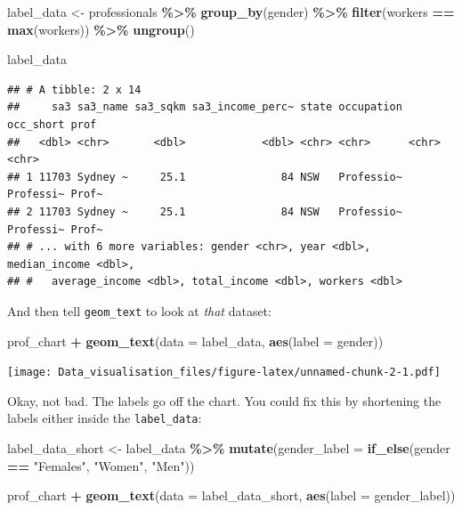 \documentclass[
]{book}
\newenvironment{Shaded}{\begin{snugshade}}{\end{snugshade}}
\newcommand{\DataTypeTok}[1]{\textcolor[rgb]{0.13,0.29,0.53}{#1}}
\newcommand{\KeywordTok}[1]{\textcolor[rgb]{0.13,0.29,0.53}{\textbf{#1}}}
\newcommand{\NormalTok}[1]{#1}
\newcommand{\OperatorTok}[1]{\textcolor[rgb]{0.81,0.36,0.00}{\textbf{#1}}}
\newcommand{\StringTok}[1]{\textcolor[rgb]{0.31,0.60,0.02}{#1}}
\begin{document}
\begin{Shaded}
\begin{Highlighting}[]
\NormalTok{label\_data \textless{}{-}}\StringTok{ }\NormalTok{professionals }\OperatorTok{\%\textgreater{}\%}\StringTok{ }
\StringTok{  }\KeywordTok{group\_by}\NormalTok{(gender) }\OperatorTok{\%\textgreater{}\%}\StringTok{ }
\StringTok{  }\KeywordTok{filter}\NormalTok{(workers }\OperatorTok{==}\StringTok{ }\KeywordTok{max}\NormalTok{(workers)) }\OperatorTok{\%\textgreater{}\%}\StringTok{ }
\StringTok{  }\KeywordTok{ungroup}\NormalTok{()}

\NormalTok{label\_data}
\end{Highlighting}
\end{Shaded}

\begin{verbatim}
## # A tibble: 2 x 14
##     sa3 sa3_name sa3_sqkm sa3_income_perc~ state occupation occ_short prof 
##   <dbl> <chr>       <dbl>            <dbl> <chr> <chr>      <chr>     <chr>
## 1 11703 Sydney ~     25.1               84 NSW   Professio~ Professi~ Prof~
## 2 11703 Sydney ~     25.1               84 NSW   Professio~ Professi~ Prof~
## # ... with 6 more variables: gender <chr>, year <dbl>, median_income <dbl>,
## #   average_income <dbl>, total_income <dbl>, workers <dbl>
\end{verbatim}

And then tell \texttt{geom\_text} to look at \emph{that} dataset:

\begin{Shaded}
\begin{Highlighting}[]
\NormalTok{prof\_chart }\OperatorTok{+}
\StringTok{  }\KeywordTok{geom\_text}\NormalTok{(}\DataTypeTok{data =}\NormalTok{ label\_data,}
            \KeywordTok{aes}\NormalTok{(}\DataTypeTok{label =}\NormalTok{ gender))}
\end{Highlighting}
\end{Shaded}

\texttt{[image: Data\_visualisation\_files/figure-latex/unnamed-chunk-2-1.pdf]}

Okay, not bad. The labels go off the chart. You could fix this by shortening the labels either inside the \texttt{label\_data}:

\begin{Shaded}
\begin{Highlighting}[]
\NormalTok{label\_data\_short \textless{}{-}}\StringTok{ }\NormalTok{label\_data }\OperatorTok{\%\textgreater{}\%}\StringTok{ }
\StringTok{  }\KeywordTok{mutate}\NormalTok{(}\DataTypeTok{gender\_label =} \KeywordTok{if\_else}\NormalTok{(gender }\OperatorTok{==}\StringTok{ "Females"}\NormalTok{, }
                             \StringTok{"Women"}\NormalTok{, }
                             \StringTok{"Men"}\NormalTok{))}

\NormalTok{prof\_chart }\OperatorTok{+}
\StringTok{  }\KeywordTok{geom\_text}\NormalTok{(}\DataTypeTok{data =}\NormalTok{ label\_data\_short,}
            \KeywordTok{aes}\NormalTok{(}\DataTypeTok{label =}\NormalTok{ gender\_label))}
\end{Highlighting}
\end{Shaded}
\end{document}
